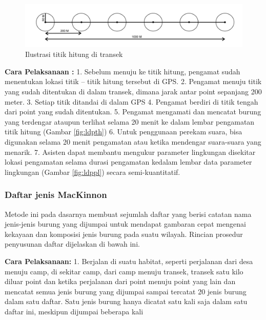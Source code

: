 \documentclass[
  oneside]{book}
\begin{document}
\begin{figure}

{\centering \includegraphics[width=1\linewidth]{images/pc_ilustration} 

}

\caption{Ilustrasi titik hitung di transek}\label{fig:figpc}
\end{figure}

\textbf{Cara Pelaksanaan :}
1. Sebelum menuju ke titik hitung, pengamat sudah menentukan lokasi titik -- titik hitung tersebut di GPS.
2. Pengamat menuju titik yang sudah ditentukan di dalam transek, dimana jarak antar point sepanjang 200 meter.
3. Setiap titik ditandai di dalam GPS
4. Pengamat berdiri di titik tengah dari point yang sudah ditentukan.
5. Pengamat mengamati dan mencatat burung yang terdengar ataupun terlihat selama 20 menit ke dalam lembar pengamatan titik hitung (Gambar \ref{fig:ldpth})
6. Untuk penggunaan perekam suara, bisa digunakan selama 20 menit pengamatan atau ketika mendengar suara-suara yang menarik.
7. Asisten dapat membantu mengukur parameter lingkungan disekitar lokasi pengamatan selama durasi pengamatan kedalam lembar data parameter lingkungan (Gambar \ref{fig:ldppl}) secara semi-kuantitatif.

\hypertarget{daftar-jenis-mackinnon}{%
\subsubsection*{Daftar jenis MacKinnon}\label{daftar-jenis-mackinnon}}

Metode ini pada dasarnya membuat sejumlah daftar yang berisi catatan nama jenis-jenis burung yang dijumpai untuk mendapat gambaran cepat mengenai kekayaan dan komposisi jenis burung pada suatu wilayah. Rincian prosedur penyusunan daftar dijelaskan di bawah ini.

\textbf{Cara Pelaksanaan:}
1. Berjalan di suatu habitat, seperti perjalanan dari desa menuju camp, di sekitar camp, dari camp menuju transek, transek satu kilo diluar point dan ketika perjalanan dari point menuju point yang lain dan mencatat semua jenis burung yang dijumpai sampai tercatat 20 jenis burung dalam satu daftar. Satu jenis burung hanya dicatat satu kali saja dalam satu daftar ini, meskipun dijumpai beberapa kali
\end{document}
